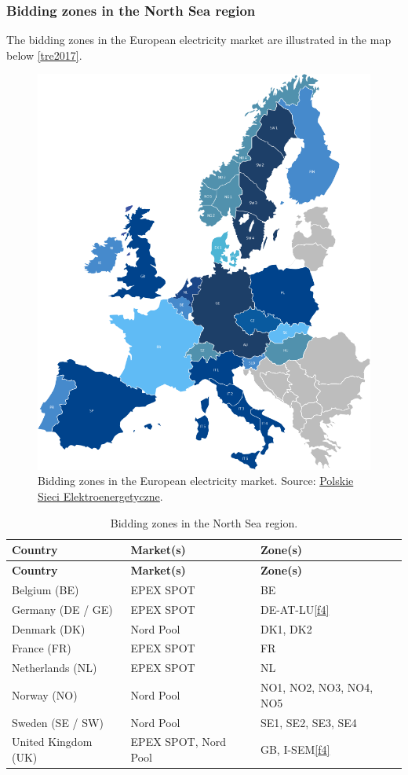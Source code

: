 \hypertarget{bidding-zones-in-the-north-sea-region}{%
\subsubsection{Bidding zones in the North Sea
region}\label{bidding-zones-in-the-north-sea-region}}

The bidding zones in the European electricity market are illustrated in
the map below \protect\hyperlink{tre2017}{{[}tre2017{]}}.

\begin{figure}
\centering
\includegraphics{images/market-map.png}
\caption{Bidding zones in the European electricity market. Source:
\href{http://raport.pse.pl/en/trends-and-market-context}{Polskie Sieci
Elektroenergetyczne}.}
\end{figure}

\begin{longtable}[]{@{}lll@{}}
\caption{Bidding zones in the North Sea region.}\tabularnewline
\toprule
\textbf{Country} & \textbf{Market(s)} & \textbf{Zone(s)}\tabularnewline
\midrule
\endfirsthead
\toprule
\textbf{Country} & \textbf{Market(s)} & \textbf{Zone(s)}\tabularnewline
\midrule
\endhead
Belgium (BE) & EPEX SPOT & BE\tabularnewline
Germany (DE / GE) & EPEX SPOT &
DE-AT-LU\protect\hyperlink{f4}{{[}f4{]}}\tabularnewline
Denmark (DK) & Nord Pool & DK1, DK2\tabularnewline
France (FR) & EPEX SPOT & FR\tabularnewline
Netherlands (NL) & EPEX SPOT & NL\tabularnewline
Norway (NO) & Nord Pool & NO1, NO2, NO3, NO4, NO5\tabularnewline
Sweden (SE / SW) & Nord Pool & SE1, SE2, SE3, SE4\tabularnewline
United Kingdom (UK) & EPEX SPOT, Nord Pool & GB,
I-SEM\protect\hyperlink{f4}{{[}f4{]}}\tabularnewline
\bottomrule
\end{longtable}

